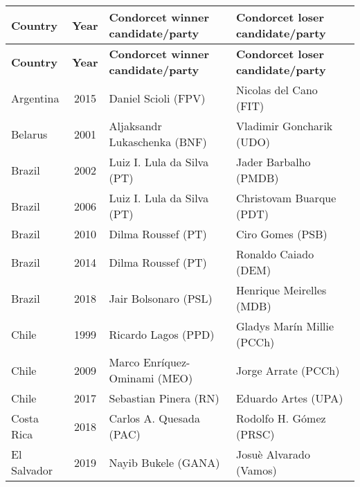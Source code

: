 \scriptsize{
\begin{longtable}{|l|c|l|l|} \toprule 
\textbf{Country} & \textbf{Year} & \textbf{Condorcet winner candidate/party} & \textbf{Condorcet loser candidate/party} \\\midrule  \endfirsthead	\midrule
\textbf{Country} & \textbf{Year} & \textbf{Condorcet winner candidate/party} & \textbf{Condorcet loser candidate/party} \\ \midrule \endhead \midrule \endfoot \bottomrule \endlastfoot \midrule 
Argentina     & 2015 & Daniel Scioli (FPV)  &  Nicolas del Cano (FIT)      \\
Belarus & 2001 & Aljaksandr Lukaschenka (BNF) & Vladimir Goncharik (UDO)  \\
 Brazil     & 2002 &   Luiz I. Lula da Silva (PT) &  Jader Barbalho (PMDB)  \\ 
 Brazil     & 2006 &  Luiz I. Lula da Silva (PT)  &  Christovam Buarque (PDT) \\ 
 Brazil     & 2010 &  Dilma Roussef (PT)   &  Ciro Gomes (PSB)  \\ 
 Brazil     & 2014 & Dilma Roussef (PT)  &   Ronaldo Caiado (DEM)        \\ 
 Brazil     & 2018 &   Jair Bolsonaro (PSL)&  Henrique Meirelles (MDB)  \\ 
 Chile      & 1999 &   Ricardo Lagos (PPD) &   Gladys Mar\'in Millie (PCCh) \\ 
 Chile     & 2009 &   Marco Enr\'iquez-Ominami (MEO)   &  Jorge Arrate (PCCh)  \\ 
 Chile     & 2017 &  Sebastian Pinera (RN)   &  Eduardo Artes (UPA)  \\ 
Costa Rica & 2018 &   Carlos A. Quesada (PAC) &   Rodolfo H. G\'omez (PRSC) \\ 
%
El Salvador & 2019 & Nayib Bukele (GANA) & Josu\`e Alvarado (Vamos) \\
%

\end{longtable}}
